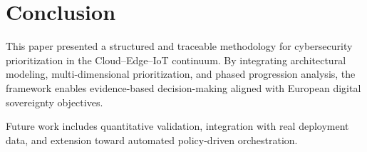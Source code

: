 \section{Conclusion}

This paper presented a structured and traceable methodology for cybersecurity prioritization in the Cloud--Edge--IoT continuum. By integrating architectural modeling, multi-dimensional prioritization, and phased progression analysis, the framework enables evidence-based decision-making aligned with European digital sovereignty objectives.

Future work includes quantitative validation, integration with real deployment data, and extension toward automated policy-driven orchestration.